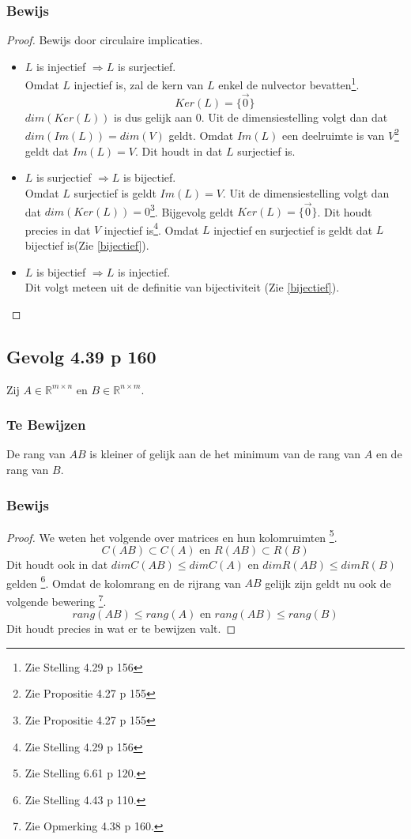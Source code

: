 \documentclass[lineaire_algebra_oplossingen.tex]{subfiles}
\begin{document}
\subsubsection*{Bewijs}
\begin{proof}
Bewijs door circulaire implicaties.
\begin{itemize}
\item $L$ is injectief $\Rightarrow L$ is surjectief.\\
Omdat $L$ injectief is, zal de kern van $L$ enkel de nulvector bevatten\footnote{Zie Stelling 4.29 p 156}.
\[Ker(L) = \{\vec{0}\}\]
$dim(Ker(L))$ is dus gelijk aan $0$. Uit de dimensiestelling volgt dan dat $dim(Im(L)) = dim(V)$ geldt. Omdat $Im(L)$ een deelruimte is van $V$\footnote{Zie Propositie 4.27 p 155} geldt dat $Im(L) = V$. Dit houdt in dat $L$ surjectief is.

\item $L$ is surjectief $\Rightarrow L$ is bijectief.\\
Omdat $L$ surjectief is geldt $Im(L)=V$. Uit de dimensiestelling volgt dan dat $dim(Ker(L)) = 0$\footnote{Zie Propositie 4.27 p 155}. Bijgevolg geldt $Ker(L) = \{\vec{0}\}$. Dit houdt precies in dat $V$ injectief is\footnote{Zie Stelling 4.29 p 156}. Omdat $L$ injectief en surjectief is geldt dat $L$ bijectief is(Zie \ref{bijectief}).

\item $L$ is bijectief $\Rightarrow L$ is injectief.\\
Dit volgt meteen uit de definitie van bijectiviteit (Zie \ref{bijectief}).
\end{itemize}
\end{proof}

\subsection{Gevolg 4.39 p 160}
\label{4.39}
Zij $A \in \mathbb{R}^{m\times n}$ en $B \in \mathbb{R}^{n\times m}$.

\subsubsection*{Te Bewijzen}
De rang van $AB$ is kleiner of gelijk aan de het minimum van de rang van $A$ en de rang van $B$.

\subsubsection*{Bewijs}
\begin{proof}
We weten het volgende over matrices en hun kolomruimten \footnote{Zie Stelling 6.61 p 120.}.
\[
C(AB) \subset C(A) \text{ en } R(AB) \subset R(B)
\]
Dit houdt ook in dat $dimC(AB) \le dimC(A)$ en $dimR(AB) \le dimR(B)$ gelden \footnote{Zie Stelling 4.43 p 110.}. Omdat de kolomrang en de rijrang van $AB$ gelijk zijn geldt nu ook de volgende bewering \footnote{Zie Opmerking 4.38 p 160.}.
\[
rang(AB) \le rang(A) \text{ en } rang(AB) \le rang(B)
\]
Dit houdt precies in wat er te bewijzen valt.
\end{proof}
\end{document}
